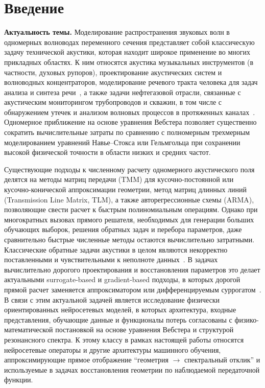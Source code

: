 \chapter*{Введение}

\textbf{Актуальность темы.} Моделирование распространения звуковых волн в одномерных волноводах переменного сечения представляет собой классическую задачу технической акустики, которая находит широкое применение во многих прикладных областях. К ним относятся акустика музыкальных инструментов (в частности, духовых рупоров), проектирование акустических систем и волноводных концентраторов, моделирование речевого тракта человека для задач анализа и синтеза речи~\cite{chiba2006}, а также задачи нефтегазовой отрасли, связанные с акустическим мониторингом трубопроводов и скважин, в том числе с обнаружением утечек и анализом волновых процессов в протяженных каналах~\cite{baroudi2019pipeline,giro2022jet}. Одномерное приближение на основе уравнения Вебстера позволяет существенно сократить вычислительные затраты по сравнению с полномерным трехмерным моделированием уравнений Навье--Стокса или Гельмгольца при сохранении высокой физической точности в области низких и средних частот.

Существующие подходы к численному расчету одномерного акустического поля делятся на методы матриц передачи (TMM) для кусочно-постоянной или кусочно-конической аппроксимации геометрии, метод матриц длинных линий (Transmission Line Matrix, TLM), а также авторегрессионные схемы (ARMA), позволяющие свести расчет к быстрым полиномиальным операциям. Однако при многократных вызовах прямого решателя, необходимых для генерации больших обучающих выборок, решения обратных задач и перебора параметров, даже сравнительно быстрые численные методы остаются вычислительно затратными. Классические обратные задачи акустики в целом являются некорректно поставленными и чувствительными к неполноте данных~\cite{colton2013,stuart2010}. В задачах вычислительно дорогого проектирования и восстановления параметров это делает актуальными surrogate-based и gradient-based подходы, в которых дорогой прямой расчет заменяется аппроксиматором или дифференцируемым суррогатом~\cite{queipo2005,hughes2019,wiecha2021}. В связи с этим актуальной задачей является исследование физически ориентированных нейросетевых моделей, в которых архитектура, входные представления, обучающие данные и функционалы потерь согласованы с физико-математической постановкой на основе уравнения Вебстера и структурой резонансного спектра. К этому классу в рамках настоящей работы относятся нейросетевые операторы и другие архитектуры машинного обучения, аппроксимирующие прямое отображение ``геометрия $\rightarrow$ спектральный отклик'' и используемые в задачах восстановления геометрии по наблюдаемой передаточной функции.

